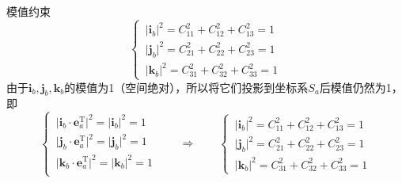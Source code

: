 \newpage

\sssection[6个约束方程]
\noa[1] 模值约束
\begin{equation}
	\begin{cases}
		\,\big|\bm{i}_b\big|^2 = C_{11}^2 + C_{12}^2 + C_{13}^2 = 1\\
		\,\big|\bm{j}_b\big|^2 = C_{21}^2 + C_{22}^2 + C_{23}^2 = 1\\
		\,\big|\bm{k}_b\big|^2 = C_{31}^2 + C_{32}^2 + C_{33}^2 = 1
	\end{cases}
\end{equation}
\proof 由于$\bm{i}_b, \bm{j}_b, \bm{k}_b$的模值为1（空间绝对），所以将它们投影到坐标系$S_a$后模值仍然为1，即
\begin{equation*}
	\begin{cases}
		\,\big|\bm{i}_b \cdot \bm{e}_a^{\text{T}}\big|^2 = \big|\bm{i}_b\big|^2 = 1\\
		\,\big|\bm{j}_b \cdot \bm{e}_a^{\text{T}}\big|^2 = \big|\bm{j}_b\big|^2 = 1\\
		\,\big|\bm{k}_b \cdot \bm{e}_a^{\text{T}}\big|^2 = \big|\bm{k}_b\big|^2 = 1\\
	\end{cases}
	\qquad \Longrightarrow \qquad 
	\begin{cases}
		\,\big|\bm{i}_b\big|^2 = C_{11}^2 + C_{12}^2 + C_{13}^2 = 1\\
		\,\big|\bm{j}_b\big|^2 = C_{21}^2 + C_{22}^2 + C_{23}^2 = 1\\
		\,\big|\bm{k}_b\big|^2 = C_{31}^2 + C_{32}^2 + C_{33}^2 = 1
	\end{cases}
\end{equation*}

